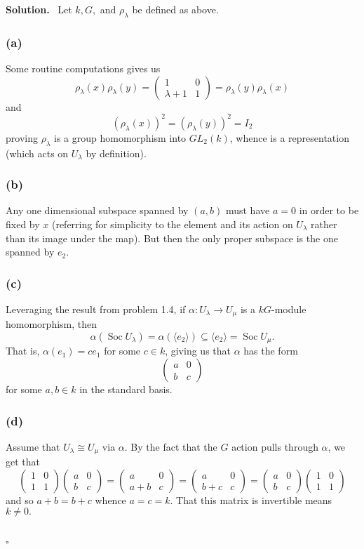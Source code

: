 \documentclass[12pt]{article}
\DeclareMathOperator{\Soc}{Soc}
\newenvironment{sol}{\noindent \textbf{Solution.} \,}{\\\hspace*{\fill}$\square$\medskip}
\begin{document}
\begin{sol}
	Let $k,G,$ and $\rho_\lambda$ be defined as above.
	\subsubsection*{(a)}
	Some routine computations gives us
	\[\rho_\lambda(x)\rho_\lambda(y)=\begin{pmatrix}1&0\\\lambda+1& 1\end{pmatrix}=\rho_\lambda(y)\rho_\lambda(x)\]
	and
	\[(\rho_\lambda(x))^2=(\rho_\lambda(y))^2=I_2\]
	proving $\rho_\lambda$ is a group homomorphism into $GL_2(k)$, whence is a representation (which acts on $U_\lambda$ by definition).
	\subsubsection*{(b)}
	Any one dimensional subspace spanned by $(a,b)$ must have $a=0$ in order to be fixed by $x$ (referring for simplicity to the element and its action on $U_\lambda$ rather than its image under the map). But then the only proper subspace is the one spanned by $e_2.$
	\subsubsection*{(c)}
	Leveraging the result from problem 1.4, if $\alpha:U_\lambda\to U_\mu$ is a $kG$-module homomorphism, then 
	\[\alpha(\Soc U_\lambda)=\alpha(\langle e_2\rangle)\subseteq \langle e_2\rangle=\Soc U_\mu.\]
	That is, $\alpha(e_1)=ce_1$ for some $c\in k$, giving us that $\alpha$ has the form
	\[\begin{pmatrix}
		a & 0\\
		b & c
	\end{pmatrix}\]
	for some $a,b\in k$ in the standard basis.
	\subsubsection*{(d)}
	Assume that $U_\lambda\cong U_\mu$ via $\alpha$. By the fact that the $G$ action pulls through $\alpha$, we get that
	\[\begin{pmatrix}1&0\\1&1\end{pmatrix}
	\begin{pmatrix}a&0\\b&c\end{pmatrix}
	=\begin{pmatrix}a&0\\a+b&c\end{pmatrix}
	=\begin{pmatrix}a&0\\b+c&c\end{pmatrix}
	=\begin{pmatrix}a&0\\b&c\end{pmatrix}
	\begin{pmatrix}1&0\\1&1\end{pmatrix}\]
	and so $a+b=b+c$ whence $a=c=k$. That this matrix is invertible means $k\ne 0.$
	

\end{sol}
\end{document}
